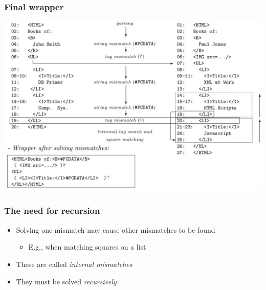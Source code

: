 \documentclass[svgnames]{beamer}
\begin{document}
\begin{frame}
    \frametitle{Final wrapper}
    
    \centering
    \includegraphics[width=\linewidth]{roadrunner-example}

    
\end{frame}


\begin{frame}
    \frametitle{The need for recursion}
    
    \begin{itemize}
    \item Solving one mismatch may cause other mismatches to be found
        \begin{itemize}
        \item E.g., when matching squares on a list
        \end{itemize}
    \item These are called \emph{internal mismatches}
    \item They must be solved \emph{recursively}
    \end{itemize}

\end{frame}


    
\end{document}
